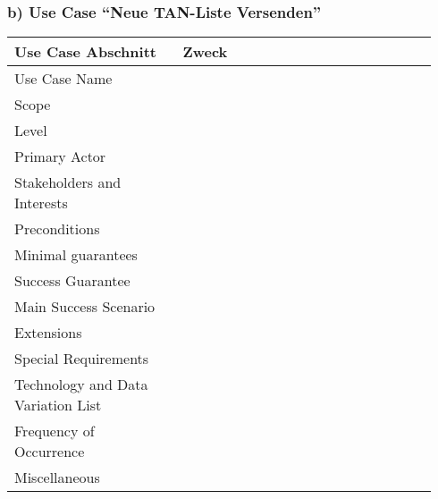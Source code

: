 \documentclass[a4paper,10pt]{article}
\begin{document}
\subsubsection*{b) Use Case ``Neue TAN-Liste Versenden''}
\begin{tabular}{|p{0.37\linewidth}|p{0.57\linewidth}|}
\hline
\textbf{Use Case Abschnitt} & \textbf{Zweck} \\
\hline
Use Case Name & \\
\hline
Scope & \\
\hline
Level & \\
\hline
Primary Actor & \\
\hline
Stakeholders and Interests & \\
\hline
Preconditions & \\
\hline
Minimal guarantees & \\
\hline
Success Guarantee & \\
\hline
Main Success Scenario & \\
\hline
Extensions & \\
\hline
Special Requirements & \\
\hline
Technology and Data Variation List & \\
\hline
Frequency of Occurrence & \\
\hline
Miscellaneous & \\
\hline
\hline
\end{tabular}
\end{document}
